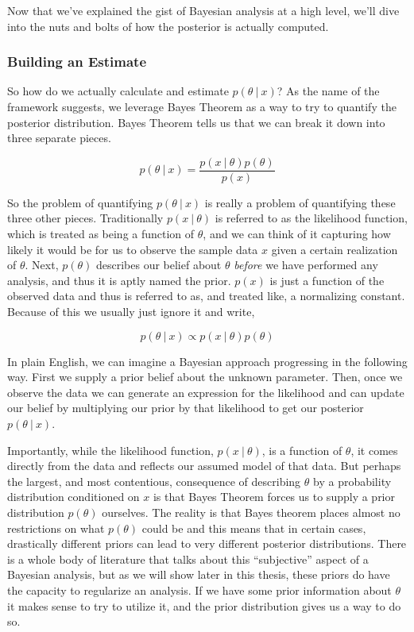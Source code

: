\documentclass[12pt,twoside]{reedthesis}
\begin{document}
Now that we've explained the gist of Bayesian analysis at a high level, we'll dive into the nuts and bolts of how the posterior is actually computed.

\hypertarget{building-an-estimate}{%
\subsubsection{Building an Estimate}\label{building-an-estimate}}

So how do we actually calculate and estimate \(p(\theta \ | \ x)\)? As the name of the framework suggests, we leverage Bayes Theorem as a way to try to quantify the posterior distribution. Bayes Theorem tells us that we can break it down into three separate pieces.

\[
p(\theta \ | \ x) =  \frac{p(x \ | \ \theta)p(\theta)}{p(x)}
\]

So the problem of quantifying \(p(\theta \ | \ x)\) is really a problem of quantifying these three other pieces. Traditionally \(p(x \ | \ \theta)\) is referred to as the likelihood function, which is treated as being a function of \(\theta\), and we can think of it capturing how likely it would be for us to observe the sample data \(x\) given a certain realization of \(\theta\). Next, \(p(\theta)\) describes our belief about \(\theta\) \emph{before} we have performed any analysis, and thus it is aptly named the prior. \(p(x)\) is just a function of the observed data and thus is referred to as, and treated like, a normalizing constant. Because of this we usually just ignore it and write,

\[
p(\theta \ | \ x) \propto p(x \ | \ \theta)p(\theta)
\]

In plain English, we can imagine a Bayesian approach progressing in the following way. First we supply a prior belief about the unknown parameter. Then, once we observe the data we can generate an expression for the likelihood and can update our belief by multiplying our prior by that likelihood to get our posterior \(p(\theta \ | \ x)\).

Importantly, while the likelihood function, \(p(x \ | \ \theta)\), is a function of \(\theta\), it comes directly from the data and reflects our assumed model of that data. But perhaps the largest, and most contentious, consequence of describing \(\theta\) by a probability distribution conditioned on \(x\) is that Bayes Theorem forces us to supply a prior distribution \(p(\theta)\) ourselves. The reality is that Bayes theorem places almost no restrictions on what \(p(\theta)\) could be and this means that in certain cases, drastically different priors can lead to very different posterior distributions. There is a whole body of literature that talks about this ``subjective'' aspect of a Bayesian analysis, but as we will show later in this thesis, these priors do have the capacity to regularize an analysis. If we have some prior information about \(\theta\) it makes sense to try to utilize it, and the prior distribution gives us a way to do so.
\end{document}
